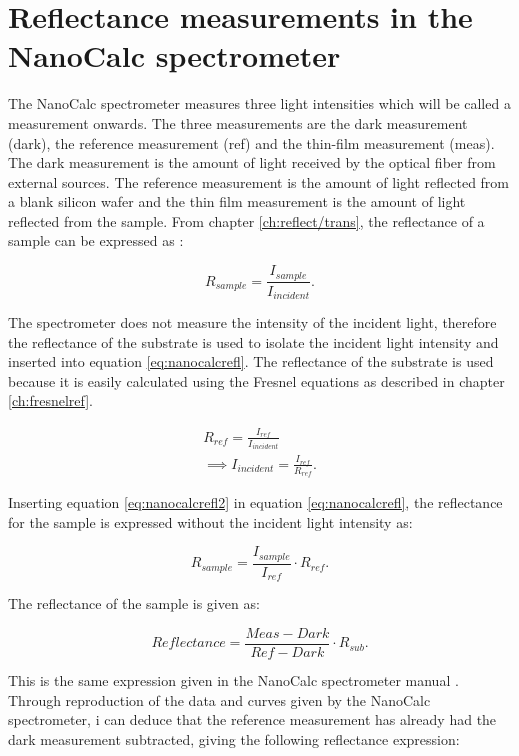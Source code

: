 \documentclass[MasterThesisMain.tex]{subfiles}
\begin{document}
\section{Reflectance measurements in the NanoCalc spectrometer}
The NanoCalc spectrometer measures three light intensities which will be called a measurement onwards. The three measurements are the dark measurement (dark), the reference measurement (ref) and the thin-film measurement (meas). The dark measurement is the amount of light received by the optical fiber from external sources. The reference measurement is the amount of light reflected from a blank silicon wafer and the thin film measurement is the amount of light reflected from the sample. From chapter \ref{ch:reflect/trans}, the reflectance of a sample can be expressed as :

\begin{equation}\label{eq:nanocalcrefl}
R_{sample} = \frac{I_{sample}}{I_{incident}}.
\end{equation}

The spectrometer does not measure the intensity of the incident light, therefore the reflectance of the substrate is used to isolate the incident light intensity and inserted into equation \ref{eq:nanocalcrefl}. The reflectance of the substrate is used because it is easily calculated using the Fresnel equations as described in chapter \ref{ch:fresnelref}.

\begin{align}
R_{ref} = \frac{I_{ref}}{I_{incident}}\\
\implies  I_{incident} = \frac{I_{ref}}{R_{ref}} \label{eq:nanocalcrefl2}.
\end{align}

Inserting equation \ref{eq:nanocalcrefl2} in equation \ref{eq:nanocalcrefl}, the reflectance for the sample is expressed without the incident light intensity as:

\begin{equation}
R_{sample} = \frac{I_{sample}}{I_{ref}} \cdot R_{ref}.
\end{equation}

The reflectance of the sample is given as:

\begin{equation}
Reflectance = \frac{Meas-Dark}{Ref-Dark} \cdot R_{sub}.
\end{equation}

This is the same expression given in the NanoCalc spectrometer manual \cite{nanocalcmanual}. Through reproduction of the data and curves given by the NanoCalc spectrometer, i can deduce that the reference measurement has already had the dark measurement subtracted, giving the following reflectance expression:
\end{document}
